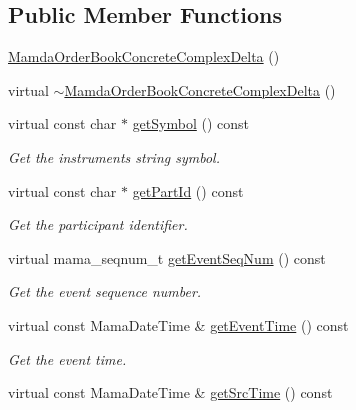 \subsection*{Public Member Functions}
\begin{CompactItemize}
\item 
\hyperlink{classWombat_1_1MamdaOrderBookConcreteComplexDelta_14e5fc572ff97295c8e2920b462e1795}{Mamda\-Order\-Book\-Concrete\-Complex\-Delta} ()
\item 
virtual \hyperlink{classWombat_1_1MamdaOrderBookConcreteComplexDelta_6d538d139930e7e9d238f82f9e0e63a4}{$\sim$Mamda\-Order\-Book\-Concrete\-Complex\-Delta} ()
\item 
virtual const char $\ast$ \hyperlink{classWombat_1_1MamdaOrderBookConcreteComplexDelta_01e27e6bf2bf1e021ffdb8e2c6a265bf}{get\-Symbol} () const 
\begin{CompactList}\small\item\em Get the instruments string symbol. \item\end{CompactList}\item 
virtual const char $\ast$ \hyperlink{classWombat_1_1MamdaOrderBookConcreteComplexDelta_caacf40ac5c44468404832849d4d738e}{get\-Part\-Id} () const 
\begin{CompactList}\small\item\em Get the participant identifier. \item\end{CompactList}\item 
virtual mama\_\-seqnum\_\-t \hyperlink{classWombat_1_1MamdaOrderBookConcreteComplexDelta_3d8aa02a57d01ca4b42fde98a1c8b2dc}{get\-Event\-Seq\-Num} () const 
\begin{CompactList}\small\item\em Get the event sequence number. \item\end{CompactList}\item 
virtual const Mama\-Date\-Time \& \hyperlink{classWombat_1_1MamdaOrderBookConcreteComplexDelta_a28362473a741fbcf14382a30f402777}{get\-Event\-Time} () const 
\begin{CompactList}\small\item\em Get the event time. \item\end{CompactList}\item 
virtual const Mama\-Date\-Time \& \hyperlink{classWombat_1_1MamdaOrderBookConcreteComplexDelta_a35d38983bbb09784e4d7fd7be18ece4}{get\-Src\-Time} () const 

\end{CompactItemize}
